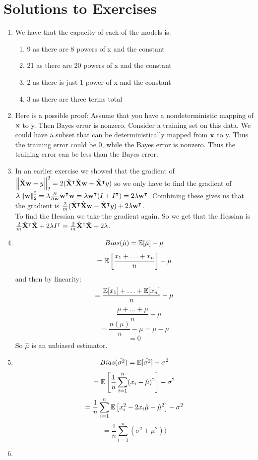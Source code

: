 \section{Solutions to Exercises}
\begin{enumerate}
    \item We have that the capacity of each of the models is:
    \begin{enumerate}
        \item 9 as there are 8 powers of x and the constant
        \item 21 as there are 20 powers of x and the constant
        \item 2 as there is just 1 power of x and the constant
        \item 3 as there are three terms total
    \end{enumerate}
    \item Here is a possible proof: Assume that you have a nondeterministic mapping of $\vx$ to y. Then Bayes error is nonzero. Consider a training set on this data. We could have a subset that can be deterministically mapped from $\vx$ to y. Thus the training error could be 0, while the Bayes error is nonzero. Thus the training error can be less than the Bayes error.
    \item In an earlier exercise we showed that the gradient of $\norm{\hat{\MX}\vw-y}_2^2=2(\hat{\MX}^\intercal\hat{\MX}\vw-\hat{\MX}^\intercal y)$ so we only have to find the gradient of $\lambda\norm{\vw}_2^2=\lambda\frac{\partial}{\partial\vw}\vw^\intercal\vw=\lambda\vw^\intercal(I+I^\intercal)=2\lambda\vw^\intercal$. Combining these gives us that the gradient is $\frac{2}{m}(\hat{\MX}^\intercal\hat{\MX}\vw-\hat{\MX}^\intercal y)+2\lambda\vw^\intercal$.\\
    To find the Hessian we take the gradient again. So we get that the Hessian is $\frac{2}{m}\hat{\MX}^\intercal\hat{\MX}+2\lambda I^\intercal=\frac{2}{m}\hat{\MX}^\intercal\hat{\MX}+2\lambda$.
    \item \[Bias(\hat{\mu}) = \Ev[\hat{\mu}] - \mu \]
    \[ = \Ev\left[\frac{x_{1} + \ldots + x_{n}}{n}\right] - \mu\]
    and then by linearity:
    \[ = \frac{\Ev[x_{1}] + \ldots + \Ev[x_{n}]}{n} - \mu\]
    \[ = \frac{\mu + \ldots + \mu}{n} - \mu\]
    \[ = \frac{n(\mu)}{n} - \mu = \mu - \mu\]
    \[ = 0\]
    So $\hat{\mu}$ is an unbiased estimator.
    \item \[Bias(\hat{\sigma^{2}}) = \Ev[\hat{\sigma^{2}}] - \sigma^{2} \]
    \[= \Ev\left[\frac{1}{n} \sum_{i = 1}^{n}(x_{i} - \hat{\mu})^{2}\right] - \sigma^{2} \]
    \[= \frac{1}{n}\sum_{i = 1}^{n}\Ev\left[x_{i}^{2} - 2x_{i}\hat{\mu}- \hat{\mu}^{2}\right]  - \sigma^{2}\]
    \[= \frac{1}{n}\sum_{i=1}^{n}(\sigma^{2} + \mu^{2}) ) \]
    \item
\end{enumerate}
